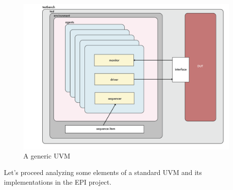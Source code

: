 \begin{figure}[H]
    \centering
    \includegraphics[scale = 0.4]{Chapter_1/img/general-uvm.png}
    \caption{A generic UVM}
    \label{gen-uvm}
\end{figure}

Let's proceed analyzing some elements of a standard UVM and its implementations in the EPI project.

